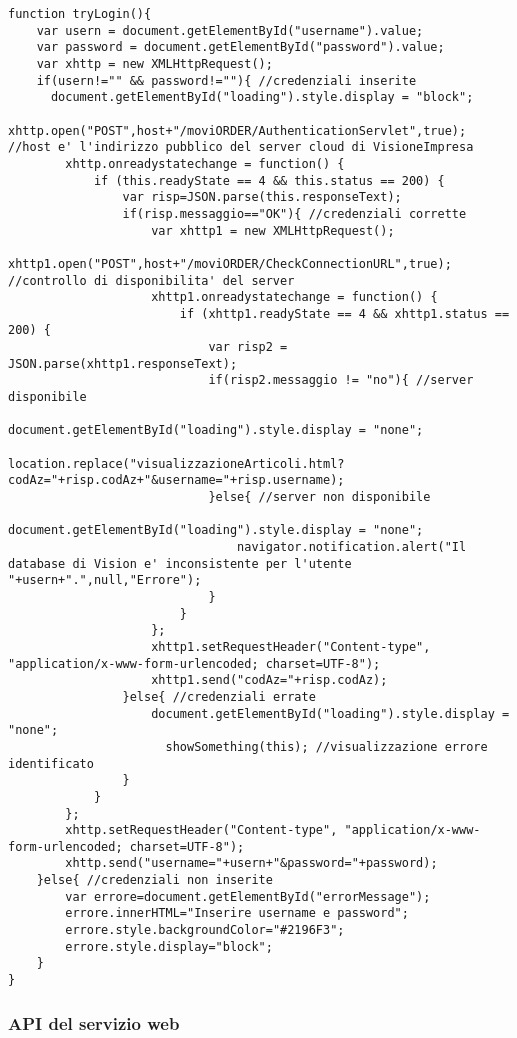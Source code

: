\begin{lstlisting}[tabsize=2]
function tryLogin(){
	var usern = document.getElementById("username").value;
	var password = document.getElementById("password").value;
	var xhttp = new XMLHttpRequest();
	if(usern!="" && password!=""){ //credenziali inserite
	  document.getElementById("loading").style.display = "block";
		xhttp.open("POST",host+"/moviORDER/AuthenticationServlet",true); //host e' l'indirizzo pubblico del server cloud di VisioneImpresa
		xhttp.onreadystatechange = function() {
			if (this.readyState == 4 && this.status == 200) {
				var risp=JSON.parse(this.responseText);
				if(risp.messaggio=="OK"){ //credenziali corrette
				    var xhttp1 = new XMLHttpRequest();
				    xhttp1.open("POST",host+"/moviORDER/CheckConnectionURL",true); //controllo di disponibilita' del server
				    xhttp1.onreadystatechange = function() {
				        if (xhttp1.readyState == 4 && xhttp1.status == 200) {
				            var risp2 = JSON.parse(xhttp1.responseText);
				            if(risp2.messaggio != "no"){ //server disponibile
				                document.getElementById("loading").style.display = "none";
				                location.replace("visualizzazioneArticoli.html?codAz="+risp.codAz+"&username="+risp.username);
				            }else{ //server non disponibile
				                document.getElementById("loading").style.display = "none";
				                navigator.notification.alert("Il database di Vision e' inconsistente per l'utente "+usern+".",null,"Errore");
				            }
				        }
				    };
				    xhttp1.setRequestHeader("Content-type", "application/x-www-form-urlencoded; charset=UTF-8");
                    xhttp1.send("codAz="+risp.codAz);
				}else{ //credenziali errate
				    document.getElementById("loading").style.display = "none";
					  showSomething(this); //visualizzazione errore identificato
				}
			}
		};
		xhttp.setRequestHeader("Content-type", "application/x-www-form-urlencoded; charset=UTF-8");
		xhttp.send("username="+usern+"&password="+password);
	}else{ //credenziali non inserite
		var errore=document.getElementById("errorMessage");
		errore.innerHTML="Inserire username e password";
		errore.style.backgroundColor="#2196F3";
		errore.style.display="block";
	}
}
\end{lstlisting}

\subsubsection{API del servizio web} \label{api}

